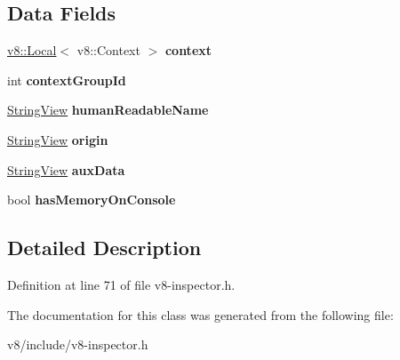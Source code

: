 \subsection*{Data Fields}
\begin{DoxyCompactItemize}
\item 
\mbox{\label{classv8__inspector_1_1V8ContextInfo_a24c69a2cb86febdcd30605f9edea8b21}} 
\mbox{\hyperlink{classv8_1_1Local}{v8\+::\+Local}}$<$ v8\+::\+Context $>$ {\bfseries context}
\item 
\mbox{\label{classv8__inspector_1_1V8ContextInfo_a4958fb8bfe5ec4aa77ebdfe29b1e9a30}} 
int {\bfseries context\+Group\+Id}
\item 
\mbox{\label{classv8__inspector_1_1V8ContextInfo_a393412db9d07a12be7b4bf8f3465b8fd}} 
\mbox{\hyperlink{classv8__inspector_1_1StringView}{String\+View}} {\bfseries human\+Readable\+Name}
\item 
\mbox{\label{classv8__inspector_1_1V8ContextInfo_acd3feac7585871ae24b2cf910140b743}} 
\mbox{\hyperlink{classv8__inspector_1_1StringView}{String\+View}} {\bfseries origin}
\item 
\mbox{\label{classv8__inspector_1_1V8ContextInfo_afda75b31c49cd9f4e664ec7068979d9a}} 
\mbox{\hyperlink{classv8__inspector_1_1StringView}{String\+View}} {\bfseries aux\+Data}
\item 
\mbox{\label{classv8__inspector_1_1V8ContextInfo_a2c523d93043e7f4b018c470dad60b41f}} 
bool {\bfseries has\+Memory\+On\+Console}
\end{DoxyCompactItemize}


\subsection{Detailed Description}


Definition at line 71 of file v8-\/inspector.\+h.



The documentation for this class was generated from the following file\+:\begin{DoxyCompactItemize}
\item 
v8/include/v8-\/inspector.\+h\end{DoxyCompactItemize}

